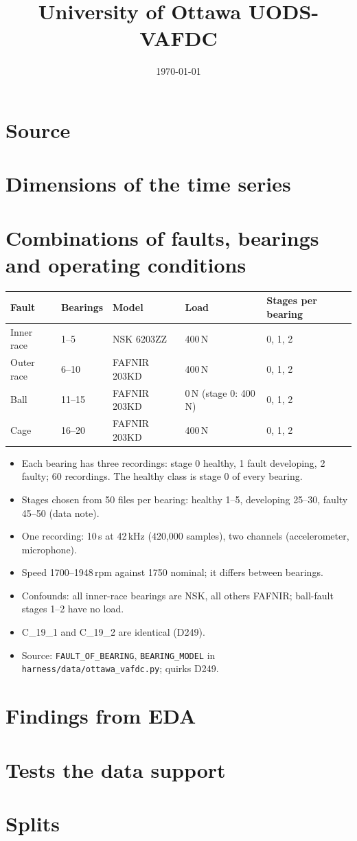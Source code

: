 \documentclass[11pt,a4paper]{article}
\title{University of Ottawa UODS-VAFDC}
\author{}
\date{\today}
\begin{document}
\maketitle

\section{Source}

\section{Dimensions of the time series}

\section{Combinations of faults, bearings and operating conditions}

\begin{table}[h]
\centering
\small
\begin{tabular}{lllll}
\toprule
Fault & Bearings & Model & Load & Stages per bearing \\
\midrule
Inner race & 1--5   & NSK 6203ZZ   & 400\,N & 0, 1, 2 \\
Outer race & 6--10  & FAFNIR 203KD & 400\,N & 0, 1, 2 \\
Ball       & 11--15 & FAFNIR 203KD & 0\,N (stage 0: 400\,N) & 0, 1, 2 \\
Cage       & 16--20 & FAFNIR 203KD & 400\,N & 0, 1, 2 \\
\bottomrule
\end{tabular}
\end{table}

\begin{itemize}
  \item Each bearing has three recordings: stage 0 healthy, 1 fault developing, 2 faulty;
        60 recordings. The healthy class is stage 0 of every bearing.
  \item Stages chosen from 50 files per bearing: healthy 1--5, developing 25--30,
        faulty 45--50 (data note).
  \item One recording: 10\,s at 42\,kHz (420,000 samples), two channels (accelerometer,
        microphone).
  \item Speed 1700--1948\,rpm against 1750 nominal; it differs between bearings.
  \item Confounds: all inner-race bearings are NSK, all others FAFNIR; ball-fault stages 1--2
        have no load.
  \item C\_19\_1 and C\_19\_2 are identical (D249).
  \item Source: \texttt{FAULT\_OF\_BEARING}, \texttt{BEARING\_MODEL} in
        \texttt{harness/data/ottawa\_vafdc.py}; quirks D249.
\end{itemize}

\section{Findings from EDA}

\section{Tests the data support}

\section{Splits}
\end{document}

